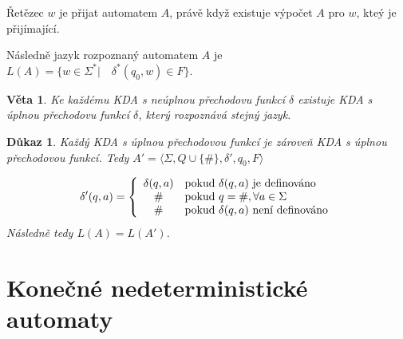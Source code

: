 \documentclass[10pt, a4paper, titlepage]{article}
\theoremstyle{note}
\newtheorem{dukaz}{Důkaz}
\newtheorem{veta}{Věta}
\begin{document}
Řetězec $w$ je přijat automatem $A$, právě když existuje výpočet $A$ pro $w$, kteý je přijímající.

Následně jazyk rozpoznaný automatem $A$ je $L(A) = \lbrace w \in \Sigma^*| \quad \delta^*(q_0,w) \in F \rbrace$.

\begin{veta}
Ke každému KDA s neúplnou přechodovu funkcí $\delta$ existuje KDA s úplnou přechodovu funkcí $\delta$, který rozpoznává stejný jazyk.
\end{veta}

\begin{dukaz}
Každý KDA s úplnou přechodovou funkcí je zároveň KDA s úplnou přechodovou funkcí. Tedy
$A' = \langle \Sigma, Q \cup \lbrace \# \rbrace, \delta', q_0, F \rangle$

\begin{gather*}
\delta'(q,a) = \left\lbrace
\begin{array}{c l}
\delta(q,a) & \text{pokud } \delta(q,a) \text{ je definováno} \\
\# & \text{pokud } q = \#, \forall a \in \Sigma \\
\# & \text{pokud } \delta(q,a) \text{ není definováno}
\end{array}
\right. \\
\end{gather*}
Následně tedy $L(A) = L(A')$.
\end{dukaz}



\section{Konečné nedeterministické automaty}
\end{document}
